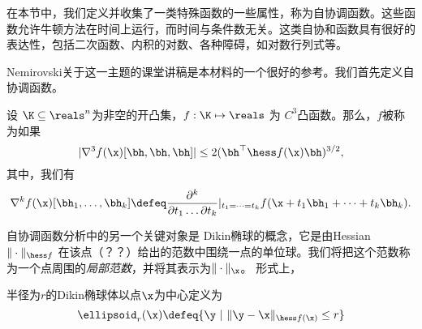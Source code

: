 在本节中，我们定义并收集了一类特殊函数的一些属性，称为自协调函数。这些函数允许牛顿方法在时间上运行，而时间与条件数无关。这类自协和函数具有很好的表达性，包括二次函数、内积的对数、各种障碍，如对数行列式等。

Nemirovski\cite{NemirovskiBook}关于这一主题的课堂讲稿是本材料的一个很好的参考。我们首先定义自协调函数。
\begin{definition}[
    自协调函数
    ]
设 $\K \subseteq \reals^n$为非空的开凸集，$f : \K \mapsto \reals$ 为 $C^3$凸函数。那么，$f$被称为如果
$$|\nabla^3 f(\x)[\bh, \bh, \bh]| \leq 2(\bh^{\top} \hess f(\x) \bh)^{3/2},$$
其中，我们有
\begin{equation*}
\nabla^k f(\x)[\bh_1, \dots, \bh_k] \defeq \frac{\partial^k}{\partial
t_1\dots\partial t_k} |_{t_1=\dots=t_k} f(\x+t_1\bh_1 + \dots + t_k\bh_k).
\end{equation*}
\end{definition}
自协调函数分析中的另一个关键对象是 Dikin椭球的概念，它是由Hessian $\|\cdot\|_{\hess f}$ 在该点（？？）给出的范数中围绕一点的单位球。我们将把这个范数称为一个点周围的\textit{局部范数}，并将其表示为$\|\cdot\|_{\x}$。
形式上，
\begin{definition}[Dikin椭球] 半径为$r$的Dikin椭球体以点$\x$为中心定义为
$$\ellipsoid_r(\x) \defeq \{\y\ |\ \|\y - \x\|_{\hess f(\x)} \leq r\}$$ 
\end{definition}
